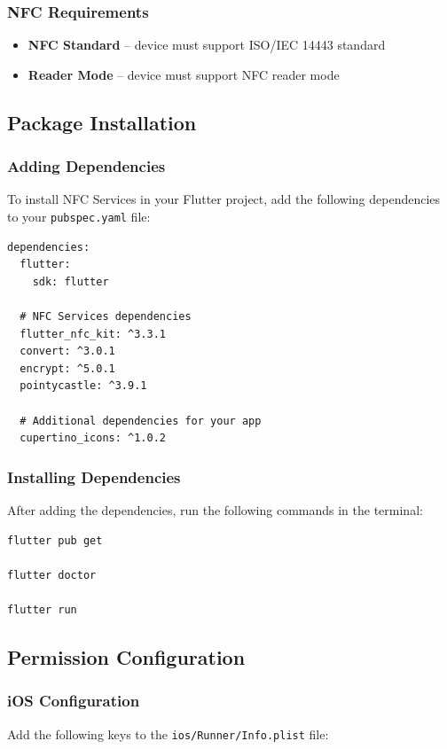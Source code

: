 \documentclass[a4paper,12pt]{article}
\begin{document}
\subsubsection{NFC Requirements}
\begin{itemize}
    \item \textbf{NFC Standard} -- device must support ISO/IEC 14443 standard
    \item \textbf{Reader Mode} -- device must support NFC reader mode
\end{itemize}

\subsection{Package Installation}

\subsubsection{Adding Dependencies}
To install NFC Services in your Flutter project, add the following dependencies to your \texttt{pubspec.yaml} file:

\begin{lstlisting}
dependencies:
  flutter:
    sdk: flutter
  
  # NFC Services dependencies
  flutter_nfc_kit: ^3.3.1
  convert: ^3.0.1
  encrypt: ^5.0.1
  pointycastle: ^3.9.1
  
  # Additional dependencies for your app
  cupertino_icons: ^1.0.2
\end{lstlisting}

\subsubsection{Installing Dependencies}
After adding the dependencies, run the following commands in the terminal:

\begin{lstlisting}[language=bash]
flutter pub get

flutter doctor

flutter run
\end{lstlisting}

\subsection{Permission Configuration}

\subsubsection{iOS Configuration}
Add the following keys to the \texttt{ios/Runner/Info.plist} file:
\end{document}
